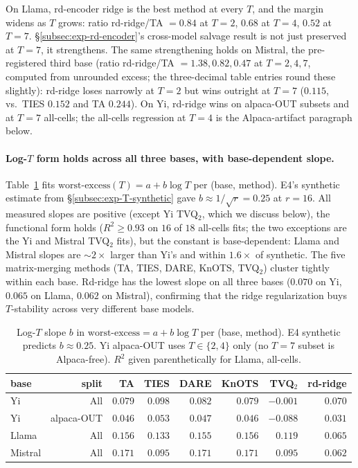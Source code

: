 On Llama, rd-encoder ridge is the best method at every $T$, and the
margin widens as $T$ grows: ratio rd-ridge/TA $= 0.84$ at $T = 2$,
$0.68$ at $T = 4$, $0.52$ at $T = 7$. \S\ref{subsec:exp-rd-encoder}'s
cross-model salvage result is not just preserved at $T = 7$, it
strengthens. The same strengthening holds on Mistral, the
pre-registered third base (ratio rd-ridge/TA $= 1.38, 0.82, 0.47$ at
$T = 2, 4, 7$, computed from unrounded excess; the three-decimal table
entries round these slightly): rd-ridge loses narrowly at $T = 2$ but wins outright
at $T = 7$ ($0.115$, vs.\ TIES $0.152$ and TA $0.244$). On Yi,
rd-ridge wins on alpaca-OUT subsets and at
$T = 7$ all-cells; the all-cells regression at $T = 4$ is the
Alpaca-artifact paragraph below.

\paragraph{Log-$T$ form holds across all three bases, with
base-dependent slope.}
Table~\ref{tab:e6-slopes} fits $\text{worst-excess}(T) = a + b \log T$
per (base, method). E4's synthetic estimate from
\S\ref{subsec:exp-T-synthetic} gave $b \approx 1 / \sqrt{r} = 0.25$
at $r = 16$. All measured slopes are positive (except Yi TVQ$_2$,
which we discuss below), the functional form holds
($R^2 \geq 0.93$ on $16$ of $18$ all-cells fits; the two exceptions
are the Yi and Mistral TVQ$_2$ fits), but the constant is
base-dependent: Llama and Mistral slopes are $\sim 2 \times$ larger
than Yi's and within $1.6 \times$ of synthetic. The five
matrix-merging methods (TA, TIES, DARE, KnOTS, TVQ$_2$) cluster
tightly within each base. Rd-ridge has the lowest slope on all three
bases ($0.070$ on Yi, $0.065$ on Llama, $0.062$ on Mistral),
confirming that the ridge regularization buys $T$-stability across
very different base models.

\begin{table}[t]
\centering
\caption{Log-$T$ slope $b$ in $\text{worst-excess} = a + b \log T$ per
(base, method). E4 synthetic predicts $b \approx 0.25$. Yi
alpaca-OUT uses $T \in \{2, 4\}$ only (no $T = 7$ subset is
Alpaca-free). $R^2$ given parenthetically for Llama, all-cells.}
\label{tab:e6-slopes}
\begin{tabular}{lr|rrrrrr}
\hline
base & split & TA & TIES & DARE & KnOTS & TVQ$_2$ & rd-ridge \\
\hline
Yi    & All        & $0.079$ & $0.098$ & $0.082$ & $0.079$ & $-0.001$ & $0.070$ \\
Yi    & alpaca-OUT & $0.046$ & $0.053$ & $0.047$ & $0.046$ & $-0.088$ & $0.031$ \\
Llama & All        & $0.156$ & $0.133$ & $0.155$ & $0.156$ & $0.119$ & $\mathbf{0.065}$ \\
Mistral & All      & $0.171$ & $0.095$ & $0.171$ & $0.171$ & $0.095$ & $\mathbf{0.062}$ \\
\hline
\end{tabular}
\end{table}

